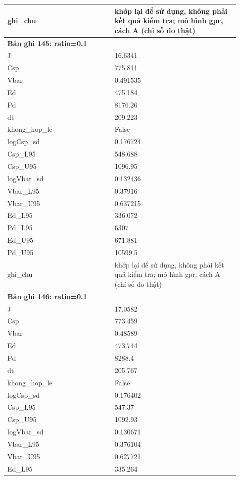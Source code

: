 \begin{longtable}{p{0.43\linewidth}p{0.50\linewidth}}
ghi\_\allowbreak chu & khớp lại để sử dụng, không phải kết quả kiểm tra; mô hình gpr, cách A (chỉ số đo thật) \\
\midrule
\multicolumn{2}{p{0.95\linewidth}}{\textbf{Bản ghi 145: ratio=0.1}} \\
J & 16.6341 \\
Csp & 775.811 \\
Vbar & 0.491535 \\
Ed & 475.184 \\
Pd & 8176.26 \\
dt & 209.223 \\
khong\_\allowbreak hop\_\allowbreak le & False \\
logCsp\_\allowbreak sd & 0.176724 \\
Csp\_\allowbreak L95 & 548.688 \\
Csp\_\allowbreak U95 & 1096.95 \\
logVbar\_\allowbreak sd & 0.132436 \\
Vbar\_\allowbreak L95 & 0.37916 \\
Vbar\_\allowbreak U95 & 0.637215 \\
Ed\_\allowbreak L95 & 336.072 \\
Pd\_\allowbreak L95 & 6307 \\
Ed\_\allowbreak U95 & 671.881 \\
Pd\_\allowbreak U95 & 10599.5 \\
ghi\_\allowbreak chu & khớp lại để sử dụng, không phải kết quả kiểm tra; mô hình gpr, cách A (chỉ số đo thật) \\
\midrule
\multicolumn{2}{p{0.95\linewidth}}{\textbf{Bản ghi 146: ratio=0.1}} \\
J & 17.0582 \\
Csp & 773.459 \\
Vbar & 0.48589 \\
Ed & 473.744 \\
Pd & 8288.4 \\
dt & 205.767 \\
khong\_\allowbreak hop\_\allowbreak le & False \\
logCsp\_\allowbreak sd & 0.176402 \\
Csp\_\allowbreak L95 & 547.37 \\
Csp\_\allowbreak U95 & 1092.93 \\
logVbar\_\allowbreak sd & 0.130671 \\
Vbar\_\allowbreak L95 & 0.376104 \\
Vbar\_\allowbreak U95 & 0.627721 \\
Ed\_\allowbreak L95 & 335.264 \\

\end{longtable}
